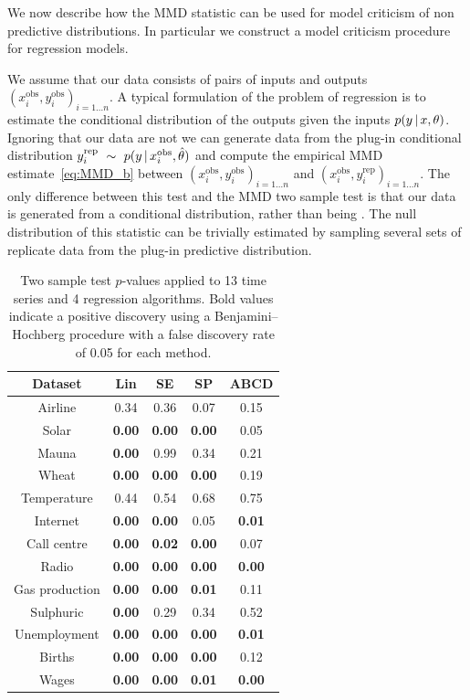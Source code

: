 \documentclass{article} %
\begin{document}
We now describe how the MMD statistic can be used for model criticism of non \iid predictive distributions.
In particular we construct a model criticism procedure for regression models.

We assume that our data consists of pairs of inputs and outputs ${(x_i^\textrm{obs}, y_i^\textrm{obs})_{i=1\ldots n}}$.
A typical formulation of the problem of regression is to estimate the conditional distribution of the outputs given the inputs ${p(y\,|\, x, \theta)}$.
Ignoring that our data are not \iid we can generate data from the plug-in conditional distribution ${y_i^\textrm{rep} \ \sim\  p(y\,|\, x_i^\textrm{obs}, \hat\theta)}$ and compute the empirical MMD estimate~\eqref{eq:MMD_b} between ${(x_i^\textrm{obs}, y_i^\textrm{obs})_{i=1\ldots n}}$ and ${(x_i^\textrm{obs}, y_i^\textrm{rep})_{i=1\ldots n}}$.
The only difference between this test and the MMD two sample test is that our data is generated from a conditional distribution, rather than being \iid.
The null distribution of this statistic can be trivially estimated by sampling several sets of replicate data from the plug-in predictive distribution.

\begin{table}
\small
\center
\begin{tabular}{|c|c|c|c|c|}
\hline
Dataset & Lin & SE & SP & ABCD \\
\hline
Airline        & 0.34 & 0.36 & 0.07 & 0.15 \\
Solar          & \bf{0.00} & \bf{0.00} & \bf{0.00} & 0.05 \\
Mauna          & \bf{0.00} & 0.99 & 0.34 & 0.21 \\
Wheat          & \bf{0.00} & \bf{0.00} & \bf{0.00} & 0.19 \\
Temperature    &  0.44 & 0.54 & 0.68 & 0.75 \\
Internet       & \bf{0.00} & \bf{0.00} & 0.05 & \bf{0.01} \\
Call centre    & \bf{0.00} & \bf{0.02} & \bf{0.00} & 0.07 \\
Radio          & \bf{0.00} & \bf{0.00} & \bf{0.00} & \bf{0.00} \\
Gas production & \bf{0.00} & \bf{0.00} & \bf{0.01} & 0.11 \\
Sulphuric      & \bf{0.00} & 0.29 & 0.34 & 0.52 \\
Unemployment   & \bf{0.00} & \bf{0.00} & \bf{0.00} & \bf{0.01} \\
Births         & \bf{0.00} & \bf{0.00} & \bf{0.00} & 0.12 \\
Wages          & \bf{0.00} & \bf{0.00} & \bf{0.01} & \bf{0.00} \\
\hline
\end{tabular}
\caption{Two sample test $p$-values applied to 13 time series and 4 regression algorithms.
Bold values indicate a positive discovery using a Benjamini--Hochberg procedure with a false discovery rate of 0.05 for each method.}
\label{table:ABCD-p-values}
\end{table}
\end{document}
